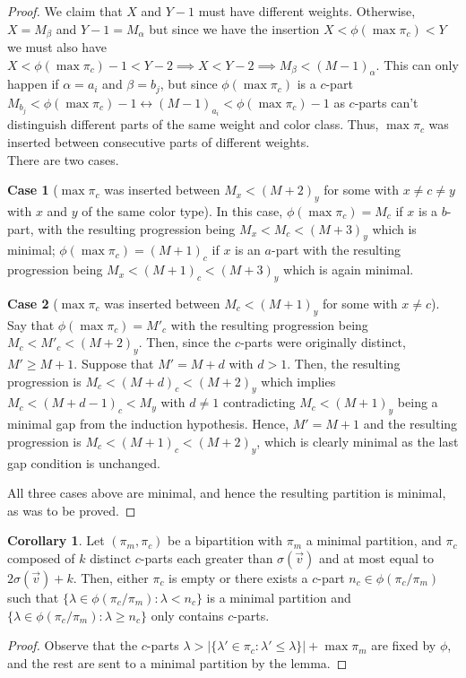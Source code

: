 \documentclass[12pt,a4paper]{amsart}
\theoremstyle{definition}
\theoremstyle{notation}
\theoremstyle{corollary}
\newtheorem{corollary}{Corollary}
\newtheorem{case}{Case}
\begin{document}
\begin{proof}
We claim that $X$ and $Y-1$ must have different weights. Otherwise, $X=M_\beta$ and  $Y-1=M_\alpha$ but since we have the insertion $X<\phi(\max{\pi_c})<Y$ we must also have $X<\phi(\max{\pi_c})-1<Y-2 \implies X<Y-2\implies M_\beta<(M-1)_\alpha$. This can only happen if $\alpha=a_i$ and $\beta=b_j$, but since $\phi(\max{\pi_c})$ is a $c$-part $M_{b_j}<\phi(\max{\pi_c})-1 \leftrightarrow (M-1)_{a_i}<\phi(\max{\pi_c})-1$ as $c$-parts can't distinguish different parts of the same weight and color class. Thus, $\max{\pi_c}$ was inserted between consecutive parts of different weights.\\

There are two cases.
\begin{case}[$\max{\pi_c}$ was inserted between $M_x<(M+2)_y$ for some with $x\not=c\not=y$ with $x$ and $y$ of the same color type]
In this case, $\phi(\max{\pi_c})=M_c$ if $x$ is a $b$-part, with the resulting progression being $M_x<M_c<(M+3)_y$ which is minimal; $\phi(\max{\pi_c})=(M+1)_c$ if $x$ is an $a$-part with the resulting progression being $M_x<(M+1)_c<(M+3)_y$ which is again minimal.
\end{case}

\begin{case}[$\max{\pi_c}$ was inserted between $M_c<(M+1)_y$ for some with $x\not=c$]

Say that $\phi(\max{\pi_c})=M'_c$ with the resulting progression being $M_c<M'_c<(M+2)_y$. Then, since the $c$-parts were originally distinct, $M'\geq M+1$. Suppose that $M'= M+d$ with $d>1$. Then, the resulting progression is $M_c<(M+d)_c<(M+2)_y$ which implies $M_c<(M+d-1)_c<M_y$ with $d\not=1$ contradicting $M_c<(M+1)_y$ being a minimal gap from the induction hypothesis. Hence, $M'=M+1$ and the resulting progression is $M_c<(M+1)_c<(M+2)_y$, which is clearly minimal as the last gap condition is unchanged.
\end{case}
All three cases above are minimal, and hence the resulting partition is minimal, as was to be proved.
\end{proof}

\begin{corollary}
Let $(\pi_{m},\pi_c)$ be a bipartition with $\pi_m$ a minimal partition, and $\pi_c$ composed of $k$ distinct $c$-parts each greater than $\sigma(\vec{v})$ and at most equal to $2\sigma(\vec{v})+k$. Then, either $\pi_c$ is empty or there exists a $c$-part $n_c\in\phi(\pi_c/\pi_m)$ such that $\{\lambda\in\phi(\pi_c/\pi_m):\lambda<n_c\}$ is a minimal partition and $\{\lambda\in\phi(\pi_c/\pi_m):\lambda\geq n_c\}$ only contains $c$-parts.
\end{corollary}
\begin{proof}
Observe that the $c$-parts $\lambda>|\{\lambda'\in\pi_c:\lambda'\leq \lambda\}|+\max{\pi_{m}}$ are fixed by $\phi$, and the rest are sent to a minimal partition by the lemma.
\end{proof}
\end{document}
